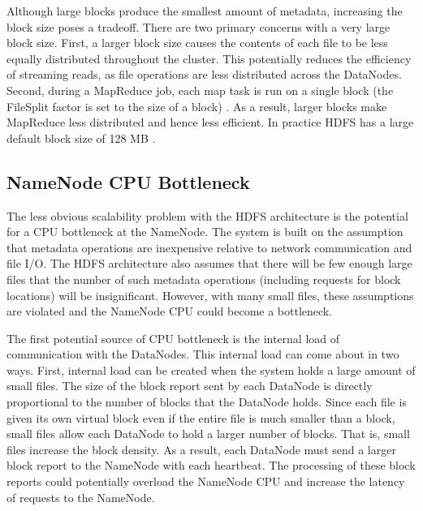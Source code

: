 \documentclass[11pt, a4paper]{article}
\begin{document}
\begin{multicols*}{2}
Although large blocks produce the smallest amount of metadata, increasing the block size poses a tradeoff. There are two primary concerns with a very large block size. First, a larger block size causes the contents of each file to be less equally distributed throughout the cluster. This potentially reduces the efficiency of streaming reads, as file operations are less distributed across the DataNodes. Second, during a MapReduce job, each map task is run on a single block (the FileSplit factor is set to the size of a block) \cite{HdfsDefaults}. As a result, larger blocks make MapReduce less distributed and hence less efficient. In practice HDFS has a large default block size of 128 MB \cite{HdfsDefaults}.

\subsection{NameNode CPU Bottleneck}
The less obvious scalability problem with the HDFS architecture is the potential for a CPU bottleneck at the NameNode. The system is built on the assumption that metadata operations are inexpensive relative to network communication and file I/O. The HDFS architecture also assumes that there will be few enough large files that the number of such metadata operations (including requests for block locations) will be insignificant. However, with many small files, these assumptions are violated and the NameNode CPU could become a bottleneck.

The first potential source of CPU bottleneck is the internal load of communication with the DataNodes. This internal load can come about in two ways. First, internal load can be created when the system holds a large amount of small files. The size of the block report sent by each DataNode is directly proportional to the number of blocks that the DataNode holds. Since each file is given its own virtual block even if the entire file is much smaller than a block, small files allow each DataNode to hold a larger number of blocks. That is, small files increase the block density. As a result, each DataNode must send a larger block report to the NameNode with each heartbeat. The processing of these block reports could potentially overload the NameNode CPU and increase the latency of requests to the NameNode.


\end{multicols*}
\end{document}
